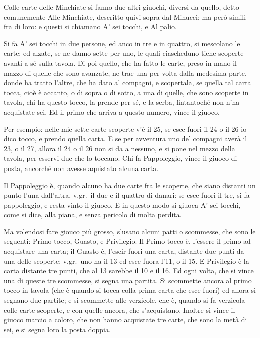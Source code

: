 Colle carte delle Minchiate si fanno
due altri giuochi, diversi da quello,
detto comunemente Alle Minchiate,
descritto quivi sopra dal Minucci; ma
però simili fra di loro: e questi si chiamano
A' sei tocchi, e Al palio.

Si fa A' sei tocchi in due persone, ed anco in tre e in quattro, si
mescolano le carte: ed alzate, se ne danno sette per uno, le quali
ciascheduno tiene scoperte avanti a sé sulla tavola.  Di poi quello,
che ha fatto le carte, preso in mano il mazzo di quelle che sono
avanzate, ne trae una per volta dalla medesima parte, donde ha tratto
l'altre, che ha dato a' compagni, e scopertala, se quella tal carta
tocca, cioè è accanto, o di sopra o di sotto, a una di quelle, che sono
scoperte in tavola, chi ha questo tocco, la prende per sé, e la serba,
fintantoché non n'ha acquistate sei. Ed il primo che arriva a questo
numero, vince il giuoco.

Per esempio: nelle mie sette carte scoperte v'è il 25, se esce fuori il
24 o il 26 io dico tocco, e prendo quella carta.  E se per avventura
uno de' compagni averà il 23, o il 27, allora il 24 o il 26 non si da a
nessuno, e si pone nel mezzo della tavola, per esservi due che lo
toccano.  Chi fa Pappoleggio, vince il giuoco di posta, ancorché non
avesse aquistato alcuna carta.

Il Pappoleggio è, quando alcuno ha due carte fra le scoperte, che siano
distanti un punto l'una dall'altra, v.gr.\ il due e il quattro di
danari: se esce fuori il tre, si fa pappoleggio, e resta vinto il
giuoco.  E in questo modo si giuoca A' sei tocchi, come si dice, alla
piana, e senza pericolo di molta perdita.

Ma volendosi fare giouco più grosso, s'usano alcuni patti o scommesse,
che sono le seguenti: Primo tocco, Guasto, e Privilegio. Il Primo tocco
è, l'essere il primo ad acquistare una carta; il Guasto è, l'escir
fuori una carta, distante due punti da una delle scoperte; v.gr.\ uno
ha il 13 ed esce fuora l'11, o il 15.  E Privilegio è la carta distante
tre punti, che al 13 sarebbe il 10 e il 16.  Ed ogni volta, che si
vince una di queste tre scommesse, si segna una partita.  Si scommette
ancora al primo tocco in tavola (che è quando si tocca colla prima
carta che esce fuori) ed allora si segnano due partite; e si scommette
alle verzicole, che è, quando si fa verzicola colle carte scoperte, e
con quelle ancora, che s'acquistano.  Inoltre si vince il giuoco marcio
a coloro, che non hanno acquistate tre carte, che sono la metà di sei,
e si segna loro la posta doppia.


